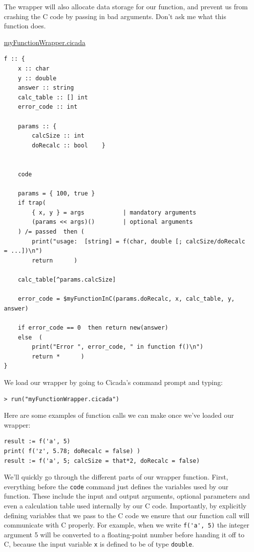\documentclass{article}
\newenvironment{code}{
       \begin{list}{}{
               \setlength{\leftmargin}{.4in}
               \setlength{\rightmargin}{0in}
               \setlength{\topsep}{.2in}
       }
       \small
       \item[] }
       { \end{list}   }
\begin{document}
\noindent The wrapper will also allocate data storage for our function, and prevent us from crashing the C code by passing in bad arguments.  Don't ask me what this function does.\\\vspace{.2in}

\noindent \underline{myFunctionWrapper.cicada}

\begin{code} \begin{verbatim}
f :: {
    x :: char
    y :: double
    answer :: string
    calc_table :: [] int
    error_code :: int
    
    params :: {
        calcSize :: int
        doRecalc :: bool    }
    
    
    code
    
    params = { 100, true }
    if trap(
        { x, y } = args           | mandatory arguments
        (params << args)()        | optional arguments
    ) /= passed  then (
        print("usage:  [string] = f(char, double [; calcSize/doRecalc = ...])\n")
        return      )
    
    calc_table[^params.calcSize]
    
    error_code = $myFunctionInC(params.doRecalc, x, calc_table, y, answer)
    
    if error_code == 0  then return new(answer)
    else  (
        print("Error ", error_code, " in function f()\n")
        return *      )
}
\end{verbatim} \end{code}

\noindent We load our wrapper by going to Cicada's command prompt and typing:

\begin{code} \begin{verbatim}
> run("myFunctionWrapper.cicada")
\end{verbatim} \end{code}

\noindent Here are some examples of function calls we can make once we've loaded our wrapper:

\begin{code} \begin{verbatim}
result := f('a', 5)
print( f('z', 5.78; doRecalc = false) )
result := f('a', 5; calcSize = that*2, doRecalc = false)
\end{verbatim} \end{code}

We'll quickly go through the different parts of our wrapper function.  First, everything before the \verb#code# command just defines the variables used by our function.  These include the input and output arguments, optional parameters and even a calculation table used internally by our C code.  Importantly, by explicitly defining variables that we pass to the C code we ensure that our function call will communicate with C properly.  For example, when we write \verb#f('a', 5)# the integer argument 5 will be converted to a floating-point number before handing it off to C, because the input variable \verb#x# is defined to be of type \verb#double#.
\end{document}
